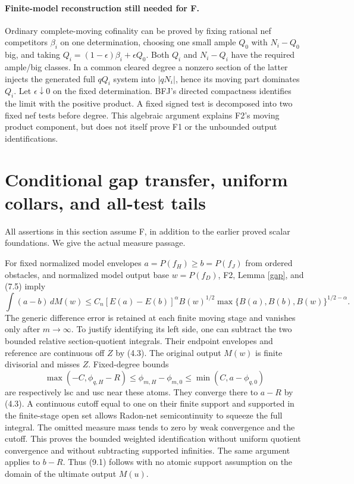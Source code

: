 \documentclass[10pt]{article}
\begin{document}
\paragraph{Finite-model reconstruction still needed for F.}
Ordinary complete-moving cofinality can be proved by fixing rational
nef competitors $\beta_i$ on one determination, choosing one small
ample $Q_0$ with $N_i-Q_0$ big, and taking
$Q_i=(1-\epsilon)\beta_i+\epsilon Q_0$. Both $Q_i$ and $N_i-Q_i$
have the required ample/big classes. In a common cleared degree a
nonzero section of the latter injects the generated full $qQ_i$
system into $|qN_i|$, hence its moving part dominates $Q_i$.
Let $\epsilon\downarrow0$ on the fixed determination. BFJ's directed
compactness identifies the limit with the positive product. A fixed
signed test is decomposed into two fixed nef tests before degree.
This algebraic argument explains F2's moving product component, but
does not itself prove F1 or the unbounded output identifications.

\section{Conditional gap transfer, uniform collars, and all-test tails}
All assertions in this section assume F, in addition to the earlier
proved scalar foundations. We give the actual measure passage.

For fixed normalized model envelopes $a=P(f_H)\geq b=P(f_J)$ from
ordered obstacles, and normalized model output base $w=P(f_D)$, F2,
Lemma \ref{gap}, and (7.5) imply
\[
 \int(a-b)\,dM(w)
 \leq C_n[E(a)-E(b)]^\alpha B(w)^{1/2}
       \max\{B(a),B(b),B(w)\}^{1/2-\alpha}.
\tag{9.1}
\]
The generic difference error is retained at each finite moving stage and
vanishes only after $m\to\infty$. To justify identifying its left side,
one can subtract the two bounded relative section-quotient integrals.
Their endpoint envelopes and reference are continuous off $Z$ by (4.3).
The original output $M(w)$ is finite divisorial and misses $Z$.
Fixed-degree bounds
\[
 \max(-C,\phi_{q,H}-R)\leq\phi_{m,H}-\phi_{m,0}
 \leq\min(C,a-\phi_{q,0})
\]
are respectively lsc and usc near these atoms. They converge there to
$a-R$ by (4.3). A continuous cutoff equal to one on their finite support
and supported in the finite-stage open set allows Radon-net
semicontinuity to squeeze the full integral. The omitted measure mass
tends to zero by weak convergence and the cutoff. This proves the
bounded weighted identification without uniform quotient convergence
and without subtracting supported infinities. The same argument applies
to $b-R$. Thus (9.1) follows with no atomic support assumption on the
domain of the ultimate output $M(u)$.
\end{document}
